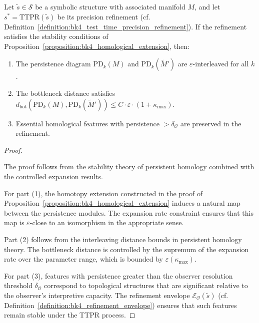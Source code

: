 \begin{theorem}
\label{theorem:bk4_topological_persistence_under_refinement}
Let $\tilde{s} \in \mathcal{S}$ be a symbolic structure with associated manifold $M$, and let $s^* = \mathrm{TTPR}(\tilde{s})$ be its precision refinement (cf. Definition~\ref{definition:bk4_test_time_precision_refinement}). If the refinement satisfies the stability conditions of Proposition~\ref{proposition:bk4_homological_extension}, then:
\begin{enumerate}
\item The persistence diagram $\text{PD}_k(M)$ and $\text{PD}_k(\widetilde{M}')$ are $\varepsilon$-interleaved for all $k$.
\item The bottleneck distance satisfies $d_{\text{bot}}(\text{PD}_k(M), \text{PD}_k(\widetilde{M}')) \leq C \cdot \varepsilon \cdot (1 + \kappa_{\max})$.
\item Essential homological features with persistence $> \delta_{\mathcal{O}}$ are preserved in the refinement.
\end{enumerate}
\end{theorem}

\begin{proof}
\label{proof:bk4_topological_persistence}
\leavevmode

The proof follows from the stability theory of persistent homology combined with the controlled expansion results.

For part (1), the homotopy extension constructed in the proof of Proposition~\ref{proposition:bk4_homological_extension} induces a natural map between the persistence modules. The expansion rate constraint ensures that this map is $\varepsilon$-close to an isomorphism in the appropriate sense.

Part (2) follows from the interleaving distance bounds in persistent homology theory. The bottleneck distance is controlled by the supremum of the expansion rate over the parameter range, which is bounded by $\varepsilon(\kappa_{\max})$.

For part (3), features with persistence greater than the observer resolution threshold $\delta_{\mathcal{O}}$ correspond to topological structures that are significant relative to the observer's interpretive capacity. The refinement envelope $\mathcal{E}_{\mathcal{O}}(\tilde{s})$ (cf. Definition~\ref{definition:bk4_refinement_envelope}) ensures that such features remain stable under the TTPR process.
\end{proof}

